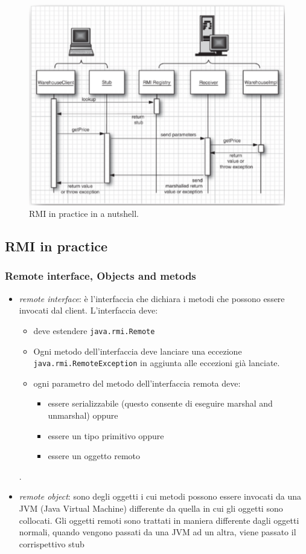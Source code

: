 \documentclass{article}
\begin{document}
\begin{figure}[h]
\centering
\includegraphics[scale=0.3]{Img/RMI.png}
\centering
\caption{RMI in practice in a nutshell.}
\label{RMIInPractice}
\end{figure}


\subsection{RMI in practice}

\subsubsection{Remote interface, Objects and metods}

\begin{itemize}
\item \emph{remote interface}:  \`e l'interfaccia che dichiara i metodi che possono essere invocati dal client. L'interfaccia deve:
\begin{itemize}
\item deve estendere \texttt{java.rmi.Remote}
\item Ogni metodo dell'interfaccia deve lanciare una eccezione \texttt{java.rmi.RemoteException} in aggiunta alle eccezioni gi\`a lanciate.
\item ogni parametro del metodo dell'interfaccia remota deve:
\begin{itemize}
\item essere serializzabile (questo consente di eseguire marshal and unmarshal) oppure
\item essere un tipo primitivo oppure
\item essere un oggetto remoto
\end{itemize}
\end{itemize}.
\item \emph{remote object}: sono degli oggetti i cui metodi possono essere invocati da una JVM (Java Virtual Machine) differente da quella in cui gli oggetti sono collocati. Gli oggetti remoti sono trattati in maniera differente dagli oggetti normali, quando vengono passati da una JVM ad un altra, viene passato il corrispettivo stub
 \end{itemize}
\end{document}
